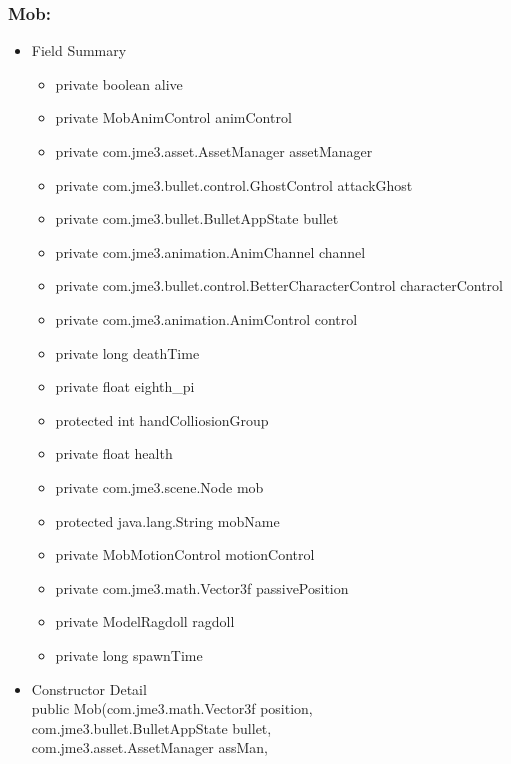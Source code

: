 \documentclass[letterpaper]{article}
\begin{document}
				\subsubsection*{Mob:}
				\vspace{0.1in}
					\begin{itemize}
						\item	Field Summary
								\begin{itemize}
									\item	private boolean	alive 
									\item	private MobAnimControl	animControl 
									\item	private com.jme3.asset.AssetManager	assetManager 
									\item	private com.jme3.bullet.control.GhostControl	attackGhost 
									\item	private com.jme3.bullet.BulletAppState	bullet 
									\item	private com.jme3.animation.AnimChannel	channel 
									\item	private com.jme3.bullet.control.BetterCharacterControl	characterControl 
									\item	private com.jme3.animation.AnimControl	control 
									\item	private long	deathTime 
									\item	private float	eighth\_pi 
									\item	protected int	handColliosionGroup 
									\item	private float	health 
									\item	private com.jme3.scene.Node	mob 
									\item	protected java.lang.String	mobName 
									\item	private MobMotionControl	motionControl 
									\item	private com.jme3.math.Vector3f	passivePosition 
									\item	private ModelRagdoll	ragdoll 
									\item	private long	spawnTime 
								\end{itemize}
						\item	Constructor Detail \\
								public Mob(com.jme3.math.Vector3f position, \\
  com.jme3.bullet.BulletAppState bullet, \\
  com.jme3.asset.AssetManager assMan, \\

\end{itemize}
\end{document}
